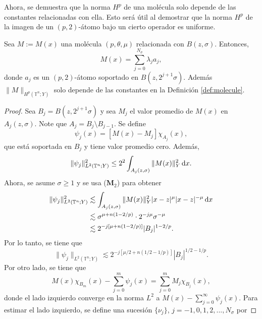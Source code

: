 Ahora, se demuestra que la norma $H^p$ de una molécula solo depende de las constantes relacionadas con ella. Esto será útil al demostrar que la norma $H^p$ de la imagen de un $(p, 2)$-átomo  bajo un cierto operador es uniforme.
\begin{lemma}
	Sea $M:=M(x)$ una molécula $(p, \theta, \mu)$ relacionada con $B(z, \sigma)$. Entonces, 
	\begin{equation*}
		M(x)=\sum_{j=0}^{N_\sigma} \lambda_j a_j,
	\end{equation*}
	donde $a_j$ es un $(p, 2)$-átomo soportado en $B(z, 2^{j+1}\sigma)$. Además $\|M\|_{H^p(\mathbb{T}^n; Y)}$ solo depende de las constantes en la Definición \ref{def:molecule}.
	\label{lem:M-in-Hp}
\end{lemma}

\begin{proof}
	Sea $B_j = B(z, 2^{j+1}\sigma)$ y sea $M_j$ el valor promedio de $M(x)$ en $A_j(z, \sigma)$. Note que $A_j = B_j \setminus B_{j-1}$. Se define 
	\begin{equation*}
		\psi_j(x) = [M(x)-M_j]\chi_{A_j}(x),
	\end{equation*}
	que está soportada en $B_j$ y tiene valor promedio cero. Además, 
	\begin{equation*}
		\|\psi_j\|_{L^2(\mathbb{T}^n;Y)}^2 \leq 2^2 \int_{A_j(z,\sigma)}\|M(x)\|_Y^2 \mathop{}\!\mathrm{d} x.
	\end{equation*}
	Ahora, se asume $\sigma\geq1$ y se usa ($\mathbf{M}_2$) para obtener
	\begin{align*}
		\|\psi_j\|_{L^2(\mathbb{T}^n;Y)}^2  & \lesssim \int_{A_j(z,\sigma)}\|M(x)\|_Y^2|x-z|^{\mu} |x-z|^{-\mu} \mathop{}\!\mathrm{d} x
		\\
		 & \lesssim \sigma^{\mu+n(1-2/p)}\cdot2^{-j\mu} \sigma^{-\mu}
		\\
		 & \lesssim 2^{-j[\mu + n(1-2/p)]} |B_j|^{1-2/p}.
	\end{align*}
	Por lo tanto, se tiene que 
	\begin{equation}
		\|\psi_j\|_{L^2(\mathbb{T}^n;Y)} \lesssim 2^{-j[\mu/2 + n(1/2-1/p)]} |B_j|^{1/2-1/p}.
		\label{eq:psi-j}
	\end{equation}
	Por otro lado, se tiene que
	\begin{equation*}
		M(x)\chi_{B_m}(x) - \sum_{j=0}^m\psi_j(x) = \sum_{j=0}^mM_j\chi_{B_j}(x),
	\end{equation*}
	donde el lado izquierdo converge en la norma $L^2$ a $M(x) -\sum_{j=0}^\infty\psi_j(x)$. Para estimar el lado izquierdo, se define una sucesión $\{\nu_j\}$, $j=-1, 0, 1, 2,...,N_\sigma$ por

\end{proof}
